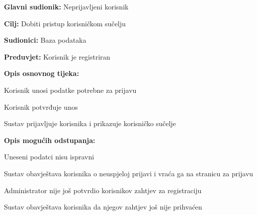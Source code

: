 					\noindent {}
					\begin{packed_item}
						
						\item \textbf{Glavni sudionik:} Neprijavljeni korisnik
						\item  \textbf{Cilj:} Dobiti pristup korisničkom sučelju
						\item  \textbf{Sudionici:} Baza podataka
						\item  \textbf{Preduvjet:} Korisnik je registriran
						\item  \textbf{Opis osnovnog tijeka:}
						
						\item[] \begin{packed_enum}
							
							\item Korisnik unosi podatke potrebne za prijavu
							\item Korisnik potvrđuje unos
							\item Sustav prijavljuje korisnika i prikazuje korisničko sučelje
						\end{packed_enum}
						
						\item  \textbf{Opis mogućih odstupanja:}
						
						\item[] \begin{packed_item}
							
							\item[2.a] Uneseni podatci nisu ispravni
							\item[] \begin{packed_enum}
								
								\item Sustav obavještava korisnika o neuspjeloj prijavi i vraća ga na stranicu za prijavu
								
							\end{packed_enum}
						
							\item[3.a] Administrator nije još potvrdio korisnikov zahtjev za registraciju
							\item[] \begin{packed_enum}
								
								\item Sustav obavještava korisnika da njegov zahtjev još nije prihvaćen
								
							\end{packed_enum}
							
						\end{packed_item}
					\end{packed_item}
				
